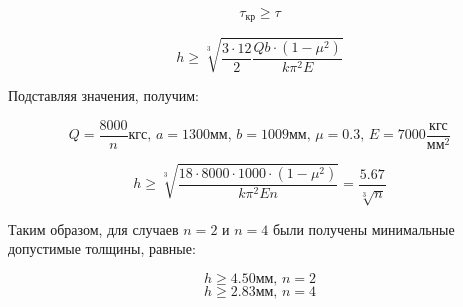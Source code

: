 \begin{equation}
\tau_\text{кр} \geq \tau  
\end{equation}

\begin{equation}
h \geq \sqrt[3]{\frac{3\cdot12}{2}\frac{Qb\cdot(1-\mu^2)}{k\pi^2E}}
\end{equation}

Подставляя значения, получим:

\begin{equation}
Q=\frac{8000}{n}\text{кгс},\,a=1300\text{мм},\,b=1009\text{мм},\,\mu=0.3,\,E=7000\frac{\text{кгс}}{\text{мм}^2}
\end{equation}

\begin{equation}
h \geq \sqrt[3]{\frac{18\cdot8000\cdot1000\cdot(1-\mu^2)}{k\pi^2En}} = \frac{5.67}{\sqrt[3]{n}} 
\end{equation}

Таким образом, для случаев $n = 2$ и $n = 4$  были получены минимальные допустимые толщины, 
равные:

\begin{equation}
h\geq4.50\text{мм},\,n=2
\end{equation}
\begin{equation}
h\geq2.83\text{мм},\,n=4
\end{equation}